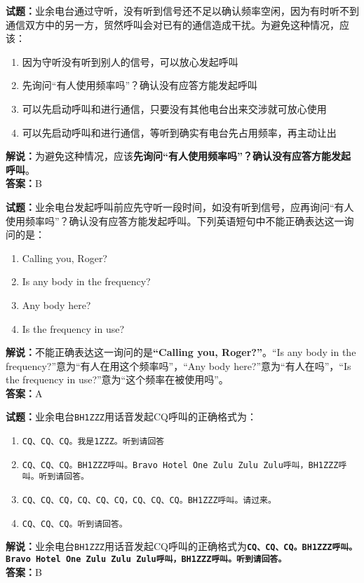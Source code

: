 \documentclass{ctexbook}
\begin{document}
\bigskip


\noindent\textbf{试题：}业余电台通过守听，没有听到信号还不足以确认频率空闲，因为有时听不到通信双方中的另一方，贸然呼叫会对已有的通信造成干扰。为避免这种情况，应该：
\begin{enumerate}[leftmargin=3em]
	\item 因为守听没有听到别人的信号，可以放心发起呼叫
	\item 先询问“有人使用频率吗”？确认没有应答方能发起呼叫
	\item 可以先启动呼叫和进行通信，只要没有其他电台出来交涉就可放心使用
	\item 可以先启动呼叫和进行通信，等听到确实有电台先占用频率，再主动让出
\end{enumerate}
\noindent\textbf{解说：}为避免这种情况，应该\textbf{先询问“有人使用频率吗”？确认没有应答方能发起呼叫}。\\\noindent\textbf{答案：}B


\bigskip


\noindent\textbf{试题：}业余电台发起呼叫前应先守听一段时间，如没有听到信号，应再询问“有人使用频率吗”？确认没有应答方能发起呼叫。下列英语短句中不能正确表达这一询问的是：
\begin{enumerate}[leftmargin=3em]
	\item Calling you, Roger?
	\item Is any body in the frequency?
	\item Any body here?
	\item Is the frequency in use?
\end{enumerate}
\noindent\textbf{解说：}不能正确表达这一询问的是\textbf{“Calling you, Roger?”}。“Is any body in the frequency?”意为“有人在用这个频率吗”，“Any body here?”意为“有人在吗”，“Is the frequency in use?”意为“这个频率在被使用吗”。\\
\noindent\textbf{答案：}A

\bigskip


\noindent\textbf{试题：}业余电台\texttt{BH1ZZZ}用话音发起CQ呼叫的正确格式为：
\begin{enumerate}[leftmargin=3em]
	\item \texttt{CQ、CQ、CQ。我是1ZZZ。听到请回答}
	\item \texttt{CQ、CQ、CQ。BH1ZZZ呼叫。Bravo Hotel One Zulu Zulu Zulu呼叫，BH1ZZZ呼叫。听到请回答。}
	\item \texttt{CQ、CQ、CQ，CQ、CQ、CQ，CQ、CQ、CQ。BH1ZZZ呼叫。请过来。}
	\item \texttt{CQ、CQ、CQ。听到请回答。}
\end{enumerate}
\noindent\textbf{解说：}业余电台\texttt{BH1ZZZ}用话音发起CQ呼叫的正确格式为\texttt{\textbf{CQ、CQ、CQ。BH1ZZZ呼叫。Bravo Hotel One Zulu Zulu Zulu呼叫，BH1ZZZ呼叫。听到请回答。}}\cite{icao}\cite[49]{yeyuwuxiandiantongxin}\\
\noindent\textbf{答案：}B
\end{document}
